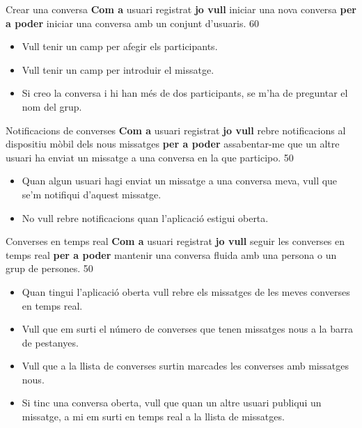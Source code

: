 \pintaHistoria
    {Crear una conversa}
    {\textbf{Com a} usuari registrat \textbf{jo vull} iniciar una nova conversa \textbf{per a poder} iniciar una conversa amb un conjunt d'usuaris.}
    {60}
    {
    \begin{itemize}[leftmargin=0.3cm]
        \item Vull tenir un camp per afegir els participants.
        \item Vull tenir un camp per introduir el missatge.
        \item Si creo la conversa i hi han més de dos participants, se m'ha de preguntar el nom del grup.
    \end{itemize}
    }
    
\pintaHistoria
    {Notificacions de converses}
    {\textbf{Com a} usuari registrat \textbf{jo vull} rebre notificacions al dispositiu mòbil dels nous missatges \textbf{per a poder} assabentar-me que un altre usuari ha enviat un missatge a una conversa en la que participo.}
    {50}
    {
    \begin{itemize}[leftmargin=0.3cm]
        \item Quan algun usuari hagi enviat un missatge a una conversa meva, vull que se'm notifiqui d'aquest missatge.
        \item No vull rebre notificacions quan l'aplicació estigui oberta.
    \end{itemize}
    }
    
\pintaHistoria
    {Converses en temps real}
    {\textbf{Com a} usuari registrat \textbf{jo vull} seguir les converses en temps real \textbf{per a poder} mantenir una conversa fluida amb una persona o un grup de persones.}
    {50}
    {
    \begin{itemize}[leftmargin=0.3cm]
        \item Quan tingui l'aplicació oberta vull rebre els missatges de les meves converses en temps real.
        \item Vull que em surti el número de converses que tenen missatges nous a la barra de pestanyes.
        \item Vull que a la llista de converses surtin marcades les converses amb missatges nous.
        \item Si tinc una conversa oberta, vull que quan un altre usuari publiqui un missatge, a mi em surti en temps real a la llista de missatges.
    \end{itemize}
    }

